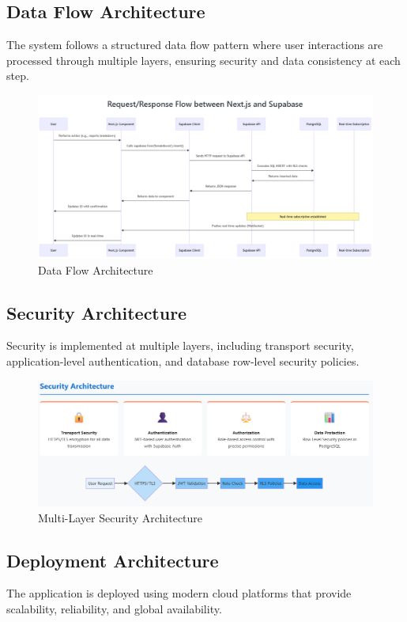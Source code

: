 \subsection{Data Flow Architecture}
The system follows a structured data flow pattern where user interactions are processed through multiple layers, ensuring security and data consistency at each step.

\begin{figure}[hbt!]
    \centering
    \includegraphics[width=0.9\linewidth]{img/chap_02/data_flow_architecture.png}
    \caption{Data Flow Architecture}
    \label{fig:data_flow_architecture}
\end{figure}

\subsection{Security Architecture}
Security is implemented at multiple layers, including transport security, application-level authentication, and database row-level security policies.

\begin{figure}[hbt!]
    \centering
    \includegraphics[width=1\linewidth]{img/chap_02/security_architecture.png}
    \caption{Multi-Layer Security Architecture}
    \label{fig:security_architecture}
\end{figure}

\subsection{Deployment Architecture}
The application is deployed using modern cloud platforms that provide scalability, reliability, and global availability.

